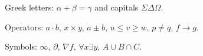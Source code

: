 Greek letters: $\alpha + \beta = \gamma$ and capitals $\Sigma \Delta \Omega$.

Operators: $a \cdot b$, $x \times y$, $a \pm b$, $u \leq v \geq w$, $p \neq q$, $f \to g$.

Symbols: $\infty$, $\partial$, $\nabla f$, $\forall x \exists y$, $A \cup B \cap C$.
